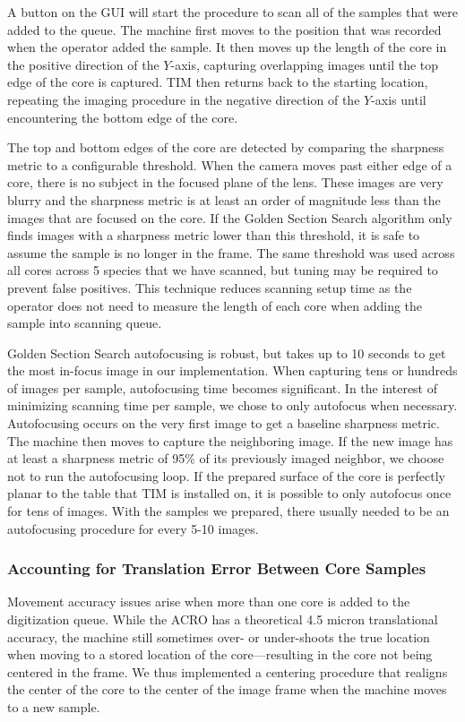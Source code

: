 \documentclass[a4paper,12pt]{article}
\begin{document}
A button on the GUI will start the procedure to scan all of the samples that were added to the queue. The machine first moves to the position that was recorded when the operator added the sample. 
It then moves up the length of the core in the positive direction of the $Y$-axis, capturing overlapping images until the top edge of the core is captured. 
TIM then returns back to the starting location, repeating the imaging procedure in the negative direction of the $Y$-axis until encountering the bottom edge of the core.

The top and bottom edges of the core are detected by comparing the sharpness metric to a configurable threshold.
When the camera moves past either edge of a core, there is no subject in the focused plane of the lens. These images are very blurry and the sharpness metric is at least an order of magnitude less than the images that are focused on the core. 
If the Golden Section Search algorithm only finds images with a sharpness metric lower than this threshold, it is safe to assume the sample is no longer in the frame. 
The same threshold was used across all cores across 5 species that we have scanned, but tuning may be required to prevent false positives. 
This technique reduces scanning setup time as the operator does not need to measure the length of each core when adding the sample into scanning queue.

Golden Section Search autofocusing is robust, but takes up to 10 seconds to get the most in-focus image in our implementation. When capturing tens or hundreds of images per sample, autofocusing time becomes significant.
In the interest of minimizing scanning time per sample, we chose to only autofocus when necessary. Autofocusing occurs on the very first image to get a baseline sharpness metric. The machine then moves to capture the neighboring image.
If the new image has at least a sharpness metric of 95\% of its previously imaged neighbor, we choose not to run the autofocusing loop. If the prepared surface of the core is perfectly planar to the table that TIM is installed on, it is possible to only autofocus once for tens of images.
With the samples we prepared, there usually needed to be an autofocusing procedure for every 5-10 images. 
  
\subsubsection{Accounting for Translation Error Between Core Samples}

Movement accuracy issues arise when more than one core is added to the digitization queue.
While the ACRO has a theoretical 4.5 micron translational accuracy, the machine still sometimes over- or under-shoots the true location when moving to a stored location of the core---resulting in the core not being centered in the frame.
We thus implemented a centering procedure that realigns the center of the core to the center of the image frame when the machine moves 
to a new sample. 
\end{document}
